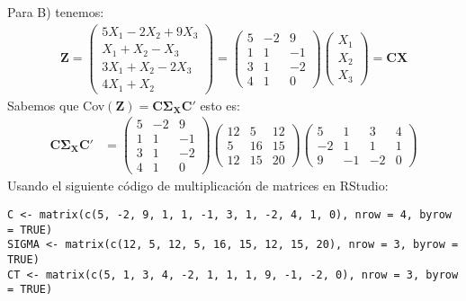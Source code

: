 \begin{sol}
Para B) tenemos:
\begin{align*}
\mathbf{Z}=\begin{pmatrix}
5X_1-2X_2+9X_3\\
X_1+X_2-X_3\\
3X_1+X_2-2X_3\\
4X_1+X_2
\end{pmatrix}=
\begin{pmatrix}
5 &-2 &9 \\
1 & 1 &-1\\
3 & 1 &-2\\
4 & 1 & 0
\end{pmatrix}
\begin{pmatrix}
X_1\\X_2\\X_3
\end{pmatrix}
= \mathbf{CX}
\end{align*}
Sabemos que Cov$(\mathbf{Z}) = \mathbf{C \Sigma_X C'}$ esto es:
\begin{align*}
\mathbf{C \Sigma_X C'} &=
\begin{pmatrix}
5 &-2 &9 \\
1 & 1 &-1\\
3 & 1 &-2\\
4 & 1 & 0
\end{pmatrix}
\begin{pmatrix}
12&5&12\\
5&16&15\\
12&15&20
\end{pmatrix}
\begin{pmatrix}
5 & 1&3 &4\\
-2& 1&1&1\\
9 &-1 & -2 &0
\end{pmatrix}
\end{align*}
Usando el siguiente código de multiplicación de matrices en RStudio:
\begin{verbatim}
C <- matrix(c(5, -2, 9, 1, 1, -1, 3, 1, -2, 4, 1, 0), nrow = 4, byrow = TRUE)
SIGMA <- matrix(c(12, 5, 12, 5, 16, 15, 12, 15, 20), nrow = 3, byrow = TRUE)
CT <- matrix(c(5, 1, 3, 4, -2, 1, 1, 1, 9, -1, -2, 0), nrow = 3, byrow = TRUE)


\end{verbatim}
\end{sol}
